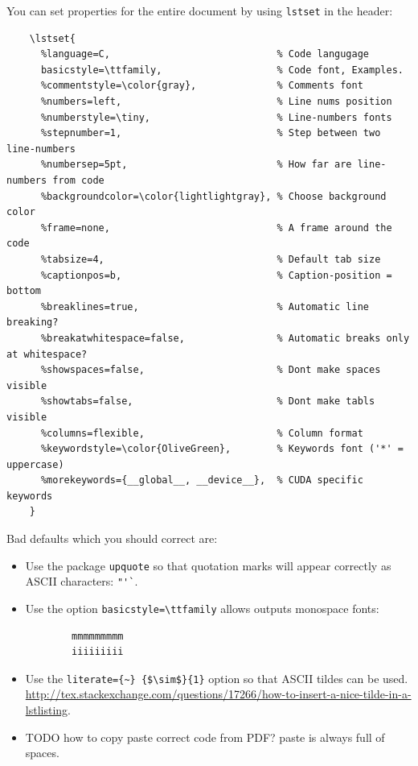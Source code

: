 \documentclass[12pt]{article}
\begin{document}
  You can set properties for the entire document by using \lstinline|lstset| in the header:

  \begin{lstlisting}
    \lstset{
      %language=C,                             % Code langugage
      basicstyle=\ttfamily,                    % Code font, Examples.
      %commentstyle=\color{gray},              % Comments font
      %numbers=left,                           % Line nums position
      %numberstyle=\tiny,                      % Line-numbers fonts
      %stepnumber=1,                           % Step between two line-numbers
      %numbersep=5pt,                          % How far are line-numbers from code
      %backgroundcolor=\color{lightlightgray}, % Choose background color
      %frame=none,                             % A frame around the code
      %tabsize=4,                              % Default tab size
      %captionpos=b,                           % Caption-position = bottom
      %breaklines=true,                        % Automatic line breaking?
      %breakatwhitespace=false,                % Automatic breaks only at whitespace?
      %showspaces=false,                       % Dont make spaces visible
      %showtabs=false,                         % Dont make tabls visible
      %columns=flexible,                       % Column format
      %keywordstyle=\color{OliveGreen},        % Keywords font ('*' = uppercase)
      %morekeywords={__global__, __device__},  % CUDA specific keywords
    }
  \end{lstlisting}

  Bad defaults which you should correct are:

  \begin{itemize}
    \item
      Use the package \lstinline|upquote| so that quotation marks will appear
      correctly as ASCII characters: \lstinline|"'`|.
    \item
      Use the option \lstinline|basicstyle=\ttfamily| allows outputs monospace fonts:
      \begin{lstlisting}
        mmmmmmmmm
        iiiiiiiii
      \end{lstlisting}
    \item
      Use the \lstinline|literate={~} {$\sim$}{1}| option so that ASCII tildes can be used. \url{http://tex.stackexchange.com/questions/17266/how-to-insert-a-nice-tilde-in-a-lstlisting}.
    \item TODO how to copy paste correct code from PDF? paste is always full of spaces.
  \end{itemize}
\end{document}
